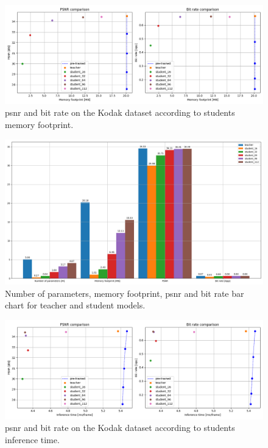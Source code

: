 \begin{figure}
    \centering
    \includegraphics[width=15cm]{../img/kd_lic_memory.png}
    \caption[\acrshort{psnr} and bit rate on the Kodak dataset according to students memory footprint.]{\acrshort{psnr} and bit rate on the Kodak dataset according to students memory footprint.}
    \label{appendix:kd_lic_memory}
\end{figure}

\begin{figure}
    \centering
    \includegraphics[width=15cm]{../img/kd_lic_bar_size.png}
    \caption[Number of parameters, memory footprint, \acrshort{psnr} and bit rate bar chart for teacher and student models.]{Number of parameters, memory footprint, \acrshort{psnr} and bit rate bar chart for teacher and student models.}
    \label{appendix:kd_lic_bar_size}
\end{figure}

\begin{figure}
    \centering
    \includegraphics[width=15cm]{../img/kd_lic_time.png}
    \caption[\acrshort{psnr} and bit rate on the Kodak dataset according to students inference time.]{\acrshort{psnr} and bit rate on the Kodak dataset according to students inference time.}
    \label{appendix:kd_lic_time}
\end{figure}

